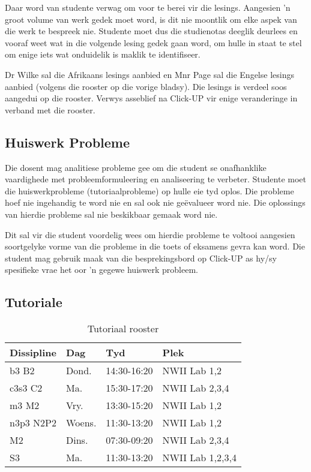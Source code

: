 	Daar word van studente verwag om voor te berei vir die lesings. Aangesien
	'n groot volume van werk gedek moet word, is dit nie moontlik om elke
	aspek van die werk te bespreek nie. Studente moet dus die studienotas 
	deeglik deurlees en vooraf weet wat in die volgende lesing gedek gaan word, om 
	hulle in staat te stel om enige iets wat onduidelik is maklik te identifiseer.
        
	Dr Wilke sal die Afrikaans lesings aanbied en Mnr Page sal die Engelse lesings
	aanbied (volgens die rooster op die vorige bladsy).  Die lesings is verdeel
	soos aangedui op die rooster.  Verwys asseblief na Click-UP vir enige
	veranderinge in verband met die rooster.
        
    \subsection{Huiswerk Probleme}
	Die dosent mag analitiese probleme gee om die student se onafhanklike
	vaardighede met probleemformuleering en analiseering te verbeter.
	Studente moet die huiswerkprobleme (tutoriaalprobleme)
	op hulle eie tyd oplos.  Die probleme hoef nie ingehandig te word nie
	en sal ook nie ge\"{e}valueer word nie.  Die oplossings van hierdie 
	probleme sal nie beskikbaar gemaak word nie.
	
	Dit sal vir die student voordelig wees om hierdie probleme te voltooi
	aangesien soortgelyke vorme van die probleme in die toets of eksamens
	gevra kan word.  Die student mag gebruik maak van die besprekingsbord op Click-UP
	as hy/sy spesifieke vrae het oor 'n gegewe huiswerk probleem.
    
    \subsection{Tutoriale}
        \begin{table}[!h]
            \begin{center}
             \begin{tabular}{|l|l|l|l|}
                 \hline
                 {\bf Dissipline} & {\bf Dag} & {\bf Tyd} & {\bf Plek} \\
                 \hline
                 b3 B2     & Dond. & 14:30-16:20 & NWII Lab 1,2 \\
                 c3s3 C2   & Ma.   & 15:30-17:20 & NWII Lab 2,3,4 \\
                 m3 M2     & Vry.   & 13:30-15:20 & NWII Lab 1,2 \\
                 n3p3 N2P2 & Woens.   & 11:30-13:20 & NWII Lab 1,2 \\
                 M2        & Dins.  & 07:30-09:20 & NWII Lab 2,3,4 \\
                 S3        & Ma.   & 11:30-13:20 & NWII Lab 1,2,3,4 \\
                 \hline
             \end{tabular}
             \caption{Tutoriaal rooster}
            \end{center}
        \end{table}
        
